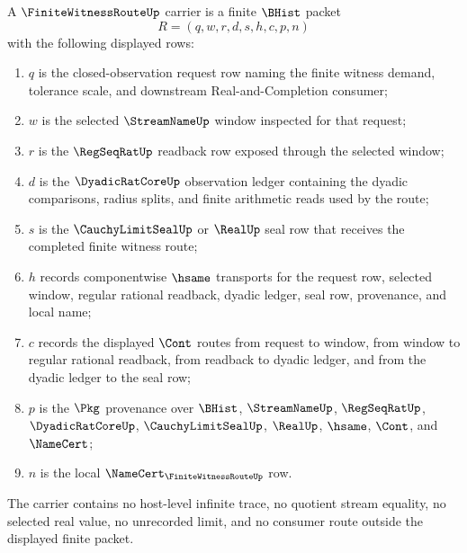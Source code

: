 \begin{definition}
\label{def:finite-witness-route-carrier}
A $\FiniteWitnessRouteUp$ carrier is a finite $\BHist$ packet
$$
R=(q,w,r,d,s,h,c,p,n)
$$
with the following displayed rows:
\begin{enumerate}
\item $q$ is the closed-observation request row naming the finite witness demand, tolerance scale, and downstream Real-and-Completion consumer;
\item $w$ is the selected $\StreamNameUp$ window inspected for that request;
\item $r$ is the $\RegSeqRatUp$ readback row exposed through the selected window;
\item $d$ is the $\DyadicRatCoreUp$ observation ledger containing the dyadic comparisons, radius splits, and finite arithmetic reads used by the route;
\item $s$ is the $\CauchyLimitSealUp$ or $\RealUp$ seal row that receives the completed finite witness route;
\item $h$ records componentwise $\hsame$ transports for the request row, selected window, regular rational readback, dyadic ledger, seal row, provenance, and local name;
\item $c$ records the displayed $\Cont$ routes from request to window, from window to regular rational readback, from readback to dyadic ledger, and from the dyadic ledger to the seal row;
\item $p$ is the $\Pkg$ provenance over $\BHist$, $\StreamNameUp$, $\RegSeqRatUp$, $\DyadicRatCoreUp$, $\CauchyLimitSealUp$, $\RealUp$, $\hsame$, $\Cont$, and $\NameCert$;
\item $n$ is the local $\NameCert_{\FiniteWitnessRouteUp}$ row.
\end{enumerate}
The carrier contains no host-level infinite trace, no quotient stream equality, no selected real value, no unrecorded limit, and no consumer route outside the displayed finite packet.
\end{definition}

